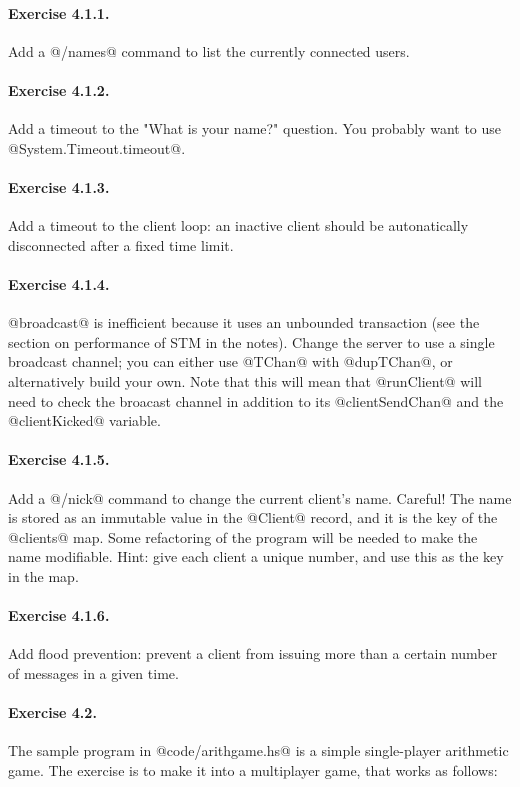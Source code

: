 \documentclass[11pt,a4paper]{article}
\begin{document}
\paragraph{Exercise 4.1.1.} Add a @/names@ command to list the currently connected users.

\paragraph{Exercise 4.1.2.} Add a timeout to the "What is your name?"
question.  You probably want to use @System.Timeout.timeout@.

\paragraph{Exercise 4.1.3.} Add a timeout to the client loop: an
inactive client should be autonatically disconnected after a fixed
time limit.

\paragraph{Exercise 4.1.4.} @broadcast@ is inefficient because it uses an
unbounded transaction (see the section on performance of STM in the
notes).  Change the server to use a single broadcast channel; you can
either use @TChan@ with @dupTChan@, or alternatively build your own.
Note that this will mean that @runClient@ will need to check the
broacast channel in addition to its @clientSendChan@ and the
@clientKicked@ variable.

\paragraph{Exercise 4.1.5.} Add a @/nick@ command to change the current
client's name.  Careful! The name is stored as an immutable value in
the @Client@ record, and it is the key of the @clients@ map.  Some
refactoring of the program will be needed to make the name modifiable.
Hint: give each client a unique number, and use this as the key in the
map.

\paragraph{Exercise 4.1.6.} Add flood prevention: prevent a client from
issuing more than a certain number of messages in a given time.

\paragraph{Exercise 4.2.} The sample program in @code/arithgame.hs@ is a
simple single-player arithmetic game.  The exercise is to make it into
a multiplayer game, that works as follows:
\end{document}
